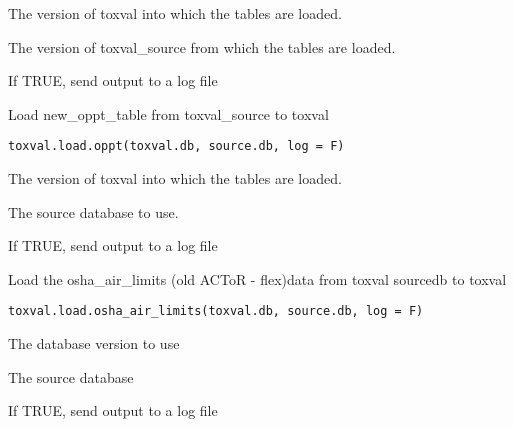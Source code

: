 \documentclass[letterpaper]{book}
\begin{document}
%
\begin{Arguments}
\begin{ldescription}
\item[\code{toxval.db}] The version of toxval into which the tables are loaded.

\item[\code{source.db}] The version of toxval\_source from which the tables are loaded.

\item[\code{log}] If TRUE, send output to a log file
\end{ldescription}
\end{Arguments}
%
\begin{Description}\relax
Load new\_oppt\_table from toxval\_source to toxval
\end{Description}
%
\begin{Usage}
\begin{verbatim}
toxval.load.oppt(toxval.db, source.db, log = F)
\end{verbatim}
\end{Usage}
%
\begin{Arguments}
\begin{ldescription}
\item[\code{toxval.db}] The version of toxval into which the tables are loaded.

\item[\code{source.db}] The source database to use.

\item[\code{log}] If TRUE, send output to a log file
\end{ldescription}
\end{Arguments}
%
\begin{Description}\relax
Load the osha\_air\_limits (old ACToR - flex)data  from toxval sourcedb to toxval
\end{Description}
%
\begin{Usage}
\begin{verbatim}
toxval.load.osha_air_limits(toxval.db, source.db, log = F)
\end{verbatim}
\end{Usage}
%
\begin{Arguments}
\begin{ldescription}
\item[\code{toxval.db}] The database version to use

\item[\code{source.db}] The source database

\item[\code{log}] If TRUE, send output to a log file
\end{ldescription}
\end{Arguments}
\end{document}
